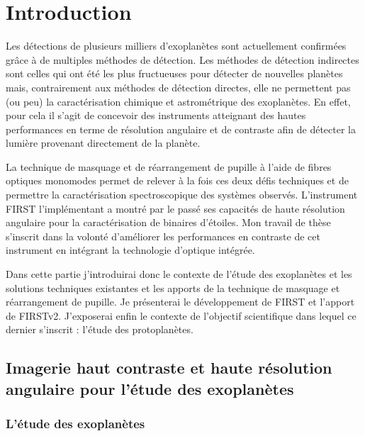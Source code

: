 \chapter{Introduction}
\setcounter{figure}{0}
\setcounter{table}{0}
\setcounter{equation}{0}

\minitoc

\clearpage
Les détections de plusieurs milliers d'exoplanètes sont actuellement confirmées grâce à de multiples méthodes de détection. Les méthodes de détection indirectes sont celles qui ont été les plus fructueuses pour détecter de nouvelles planètes mais, contrairement aux méthodes de détection directes, elle ne permettent pas (ou peu) la caractérisation chimique et astrométrique des exoplanètes. En effet, pour cela il s'agit de concevoir des instruments atteignant des hautes performances en terme de résolution angulaire et de contraste afin de détecter la lumière provenant directement de la planète.

La technique de masquage et de réarrangement de pupille à l'aide de fibres optiques monomodes permet de relever à la fois ces deux défis techniques et de permettre la caractérisation spectroscopique des systèmes observés. L'instrument \ac{FIRST} l'implémentant a montré par le passé ses capacités de haute résolution angulaire pour la caractérisation de binaires d'étoiles. Mon travail de thèse s'inscrit dans la volonté d'améliorer les performances en contraste de cet instrument en intégrant la technologie d'optique intégrée.

Dans cette partie j'introduirai donc le contexte de l'étude des exoplanètes et les solutions techniques existantes et les apports de la technique de masquage et réarrangement de pupille. Je présenterai le développement de \ac{FIRST} et l'apport de \ac{FIRSTv2}. J'exposerai enfin le contexte de l'objectif scientifique dans lequel ce dernier s'inscrit : l'étude des protoplanètes.


\section{Imagerie haut contraste et haute résolution angulaire pour l'étude des exoplanètes}

\subsection{L'étude des exoplanètes}

